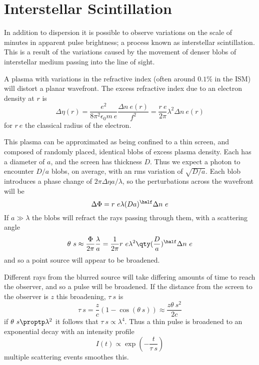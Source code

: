 \section{Interstellar Scintillation}
\label{sec:interst-scint}

In addition to dispersion it is possible to observe variations on the
scale of minutes in apparent pulse brightness; a process known as
interstellar scintillation. This is a result of the variations caused
by the movement of denser blobs of interstellar medium passing into
the line of sight.

A plasma with variations in the refractive index (often around $0.1\%$
in the ISM) will distort a planar wavefront. The excess refractive
index due to an electron density at $r$ is
\begin{equation}
  \label{eq:108}
  \Delta \eta(r) = \frac{e^2}{8 \pi^2 \epsilon_0 m~e} \frac{\Delta n~e(r)}{f^2} = \frac{r~e}{2 \pi} \lambda^2 \Delta n~e(r)
\end{equation}
for $r~e$ the classical radius of the electron.

This plasma can be approximated as being confined to a thin screen,
and composed of randomly placed, identical blobs of excess plasma
density. Each has a diameter of $a$, and the screen has thickness
$D$. Thus we expect a photon to encounter $D/a$ blobs, on average,
with an rms variation of $\sqrt{D/a}$. Each blob introduces a phase
change of $2\pi \Delta \eta a/\lambda$, so the perturbations across
the wavefront will be
\begin{equation}
  \label{eq:109}
  \Delta \Phi = r~e \lambda (Da)^{\half} \Delta n~e
\end{equation}
If $a \gg \lambda$ the blobs will refract the rays passing through
them, with a scattering angle
\begin{equation}
  \label{eq:110}
  \theta~s \approx \frac{\Phi}{2 \pi} \frac{\lambda}{a} = \frac{1}{2 \pi} r~e \lambda^2 \qty( \frac{D}{a} )^{\half} \Delta n~e
\end{equation}
and so a point source will appear to be broadened. 

Different rays from the blurred source will take differing amounts of
time to reach the observer, and so a pulse will be broadened. If the
distance from the screen to the observer is $z$ this broadening,
$\tau~s$ is
\begin{equation}
  \label{eq:111}
  \tau~s = \frac{z}{c} (1-\cos(\theta~s) ) \approx \frac{z \theta~s^2}{2 c}
\end{equation}
if $\theta~s \proptp \lambda^2$ it follows that $\tau~s \propto
\lambda^4$. Thus a thin pulse is broadened to an exponential decay
with an intensity profile
\[ I(t) \propto \exp(- \frac{t}{\tau~s} ) \] multiple scattering
events smoothes this.
 

